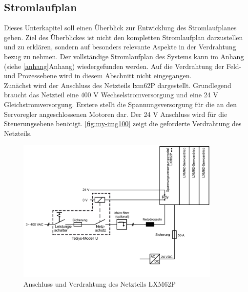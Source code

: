 \documentclass[../../../Bachelorarbeit.tex]{subfiles}
\begin{document}
\subsection{Stromlaufplan} \label{Stromlaufplan}
Dieses Unterkapitel soll einen Überblick zur Entwicklung des Stromlaufplanes geben. Ziel des Überblickes ist nicht den kompletten Stromlaufplan darzustellen und zu erklären, sondern auf besonders relevante Aspekte in der Verdrahtung bezug zu nehmen. Der vollständige Stromlaufplan des Systems kann im Anhang (siehe \autoref{anhang}Anhang) wiedergefunden werden. Auf die Verdrahtung der Feld- und Prozessebene wird in diesem Abschnitt nicht eingegangen.\\
Zunächst wird der Anschluss des Netzteils \acs{lxm}62P dargestellt. Grundlegend braucht das Netzteil eine 400 \si{V} Wechselstromversorgung und eine 24 \si{V} Gleichstromversorgung. Erstere stellt die Spannungsversorgung für die an den Servoregler angeschlossenen Motoren dar. Der 24 \si{V} Anschluss wird für die Steuerungsebene benötigt. \autoref{fig:my-img100} zeigt die geforderte Verdrahtung des Netzteils. 

\begin{figure}[H]
    \centering
    \includegraphics[width=0.9\textwidth]{Images/netzteil_verdrahtung.png}
    \caption[Netzteilverdrahtung]{Anschluss und Verdrahtung des Netzteils LXM62P}
    \label{fig:my-img100}
\end{figure}
\end{document}
